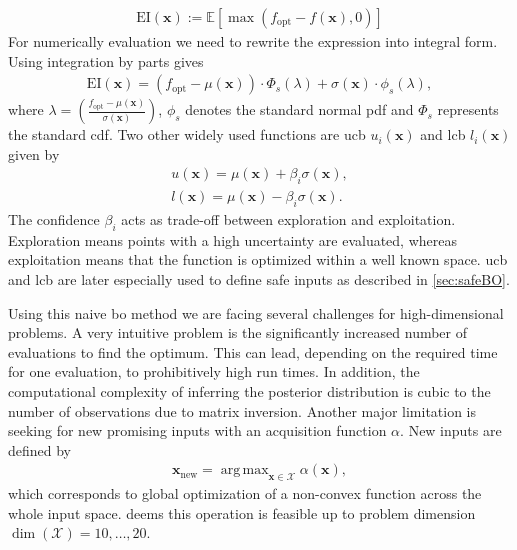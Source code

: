 \documentclass{ifacconf}
\newcounter{part}
\DeclareMathOperator*{\argmax}{arg\,max}
\begin{document}
\begin{align}
    \mathrm{EI}(\bm{x}) := \mathbb{E}\left[\max(f_\mathrm{opt}-f(\bm{x}),0)\right]
\end{align}   
For numerically evaluation we need to rewrite the expression into integral form. Using integration by parts gives
\begin{align}
    \mathrm{EI}(\bm{x}) = \left(f_\mathrm{opt}-\mu(\bm{x})\right)\cdot \Phi_s\left(\lambda\right) + \sigma(\bm{x})\cdot \phi_s \left(\lambda\right),
    \label{eq:ei}
\end{align}
where \(\lambda = \left(\frac{f_\mathrm{opt}-\mu(\bm{x})}{\sigma(\bm{x})}\right)\), \(\phi_s\) denotes the standard normal \gls{pdf} and \(\Phi_s\) represents the standard \gls{cdf}.
Two other widely used functions are \gls{ucb} \(u_i(\bm{x})\) and \gls{lcb} \(l_i(\bm{x})\) given by
\begin{equation}
\begin{aligned}
    u(\bm{x}) = \mu(\bm{x}) + \beta_i\sigma(\bm{x}),\\
    l(\bm{x}) = \mu(\bm{x}) - \beta_i\sigma(\bm{x}).
    \label{eq:ucb_lcb}
\end{aligned}
\end{equation}
The confidence \(\beta_i\) acts as trade-off between exploration and exploitation. Exploration means points with a high uncertainty are evaluated, whereas exploitation means that the function is optimized within a well known space. \gls{ucb} and \gls{lcb} are later especially used to define safe inputs as described in \cref{sec:safeBO}.

Using this naive \gls{bo} method we are facing several challenges for high-dimensional problems.
A very intuitive problem is the significantly increased number of evaluations to find the optimum. This can lead, depending on the required time for one evaluation, to prohibitively high run times. In addition, the computational complexity of inferring the posterior distribution is cubic to the number of observations due to matrix inversion. Another major limitation is seeking for new promising inputs with an acquisition function \(\alpha\). New inputs are defined by 
\begin{align}
    \bm{x}_\mathrm{new} = \argmax_{\bm{x} \in \mathcal{X}}\alpha(\bm{x}),
\end{align}
which corresponds to global optimization of a non-convex function across the whole input space. \cite{Moriconi2020} deems this operation is feasible up to problem dimension \(\dim(\mathcal{X}) = 10, \dots, 20\).
\end{document}
